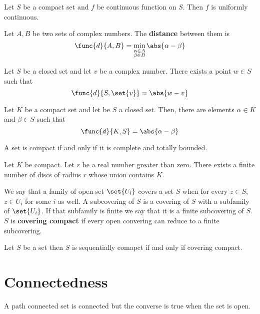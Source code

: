 \begin{theorem}
      Let \(S\) be a compact set and \(f\) be continuous function on \(S\). Then  \(f\) is uniformly continuous.
\end{theorem}


\begin{definition}
      Let \(A,B\) be two sets of complex numbers. The \textbf{distance} between them is 
      \begin{equation*}
            \func{d}{A,B} = \min_{\substack{\alpha \in A \\ \beta \in B}} \abs{\alpha - \beta}
      \end{equation*}
\end{definition}

\begin{theorem}
      Let \(S\) be a closed set and let \(v\) be a complex number. There exists a point \(w \in S\) such that 
      \begin{equation*}
            \func{d}{S,\set{v}} = \abs{w - v}
      \end{equation*}
\end{theorem}

\begin{theorem}
      Let \(K\) be a compact set and let be \(S\) a closed set. Then, there are elements \(\alpha \in K\) and \(\beta \in S\) such that 
      \begin{equation*}
            \func{d}{K,S} = \abs{\alpha - \beta}
      \end{equation*}
\end{theorem}

\begin{theorem}
      A set is compact if and only if it is complete and totally bounded.
\end{theorem}

\begin{corollary}
      Let \(K\) be compact. Let \(r\) be a real number greater than zero. There exists a finite number of discs of radius \(r\) whose union contains \(K\).
\end{corollary}

We say that a family of open set \(\set{U_i}\) covers a set \(S\) when for every \(z \in S\), \(z \in U_i\) for some \(i\) as well. A subcovering of \(S\) is a covering of \(S\) with a subfamily of \(\set{U_i}\). If that subfamily is finite we say that it is a finite subcovering of \(S\). \(S\) is \textbf{covering compact} if every open convering can reduce to a finite subcovering.

\begin{theorem}
      Let \(S\) be a set then \(S\) is sequentially comapct if and only if covering compact.
\end{theorem}


\section{Connectedness}
\begin{proposition}
      A path connected set is connected but the converse is true when the set is open.
\end{proposition}